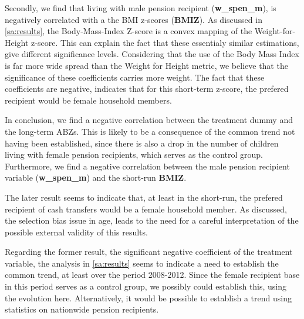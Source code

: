 \begin{refsection}
Secondly, we find that living with male pension recipient (\textbf{w\_spen\_m}),
is negatively correlated with a the BMI z-scores (\textbf{BMIZ}).
As discussed in \autoref{sa:results}, the Body-Mass-Index Z-score is a convex mapping of the Weight-for-Height z-score.
This can explain the fact that these essentialy similar estimations, give different significance levels.
Considering that the use of the Body Mass Index is far more wide spread than the Weight for Height metric,
we believe that the significance of these coefficients carries more weight.
The fact that these coefficients are negative, indicates that for this short-term z-score,
the prefered recipient would be female household members.

In conclusion, we find a negative correlation between the treatment dummy and the long-term ABZs.
This is likely to be a consequence of the common trend not having been established,
since there is also a drop in the number of children living with female pension recipients, which serves as the control group.
Furthermore, we find a negative correlation between the male pension recipient variable (\textbf{w\_spen\_m}) and the short-run \textbf{BMIZ}.

The later result seems to indicate that, at least in the short-run,
the prefered recipient of cash transfers would be a female household member.
As discussed, the selection bias issue in age,
leads to the need for a careful interpretation of the possible external validity of this results.

Regarding the former result, the significant negative coefficient of the treatment variable,
the analysis in \autoref{sa:results} seems to indicate a need to establish the common trend,
at least over the period 2008-2012.
Since the female recipient base in this period serves as a control group, we possibly could establish this, using the evolution here.
Alternatively, it would be possible to establish a trend using statistics on nationwide pension recipients.

\printbibliography
\end{refsection}